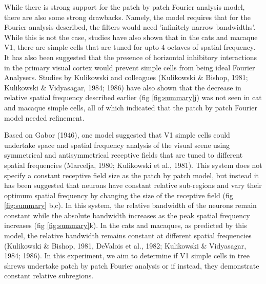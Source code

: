 	While there is strong support for the patch by patch Fourier analysis model, there are also some strong drawbacks. Namely, the model requires that for the Fourier analysis described, the filters would need 'infinitely narrow bandwidths'. While this is not the case, studies have also shown that in the cats and macaque V1, there are simple cells that are tuned for upto 4 octaves of spatial frequency. It has also been suggested that the presence of horizontal inhibitory interactions in the primary visual cortex would prevent simple cells from being ideal Fourier Analysers. Studies by Kulikowski and colleagues (Kulikowski \& Bishop, 1981; Kulikowski \& Vidyasagar, 1984; 1986) have also shown that the decrease in relative spatial frequency described earlier (fig \ref{fig:summary}j) was not seen in cat and macaque simple cells, all of which indicated that the patch by patch Fourier model needed refinement.
	
	Based on Gabor (1946), one model suggested that V1 simple cells could undertake space and spatial frequency analysis of the visual scene using symmetrical and antisymmetrical receptive fields that are tuned to different spatial frequencies (Marcelja, 1980; Kulikowski et al., 1981). This system does not specify a constant receptive field size as the patch by patch model, but instead it has been suggested that neurons have constant relative sub-regions and vary their optimum spatial frequency by changing the size of the receptive field (fig \ref{fig:summary} b,c). In this system, the relative bandwidth of the neurons remain constant while the absolute bandwidth increases as the peak spatial frequency increases (fig \ref{fig:summary}k). In the cats and macaques, as predicted by this model, the relative bandwidth remains constant at different spatial frequencies (Kulikowski \& Bishop, 1981, DeValois et al., 1982; Kulikowski \& Vidyasagar, 1984; 1986). In this experiment, we aim to determine if V1 simple cells in tree shrews undertake patch by patch Fourier analysis or if instead, they demonstrate constant relative subregions.
	
